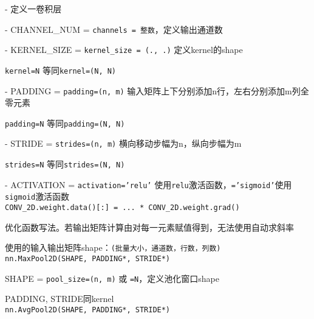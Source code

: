 \documentclass[UTF8]{ctexart}
\begin{document}
  - 定义一卷积层

  - CHANNEL\_NUM = \texttt{channels = 整数}，定义输出通道数

  - KERNEL\_SIZE = \texttt{kernel\_size = (., .)} 定义kernel的shape

  \quad \texttt{kernel=N} 等同\texttt{kernel=(N, N)}
  
  - PADDING = \texttt{padding=(n, m)}  输入矩阵上下分别添加n行，左右分别添加m列全零元素

  \quad \texttt{padding=N} 等同\texttt{padding=(N, N)}
  
  - STRIDE = \texttt{strides=(n, m)} 横向移动步幅为n，纵向步幅为m
  
  \quad \texttt{strides=N} 等同\texttt{strides=(N, N)}
  
  - ACTIVATION = \texttt{activation='relu'} 使用\texttt{relu}激活函数，\texttt{='sigmoid'}使用\texttt{sigmoid}激活函数\\
\texttt{CONV\_2D.weight.data()[:] = ... * CONV\_2D.weight.grad()}

  优化函数写法。若输出矩阵计算由对每一元素赋值得到，无法使用自动求斜率
  
  使用的输入输出矩阵shape：\texttt{(批量大小，通道数，行数，列数)}\\
\texttt{nn.MaxPool2D(SHAPE, PADDING*, STRIDE*)}

  SHAPE = \texttt{pool\_size=(n, m)} 或 \texttt{=N}，定义池化窗口shape

  PADDING, STRIDE同kernel\\
\texttt{nn.AvgPool2D(SHAPE, PADDING*, STRIDE*)}  
\end{document}
